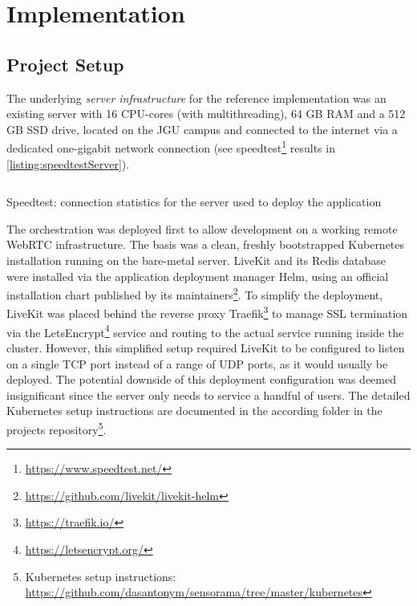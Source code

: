 \chapter{Implementation}
\label{ch:implementation}

\section{Project Setup}
\label{sec:project-setup}

The underlying \emph{server infrastructure} for the reference implementation was an existing server with 16 \ac{CPU}-cores (with multithreading), 64 \ac{GB} \ac{RAM} and a 512 \ac{GB} \ac{SSD} drive, located on the \ac{JGU} campus and connected to the internet via a dedicated one-gigabit network connection (see speedtest\footnote{\url{https://www.speedtest.net/}} results in \autoref{listing:speedtestServer}).

\begin{listing}[!ht]
\inputminted{text}{04_Artefakte/03_Listings/speedtest-server.txt}
\caption{Speedtest: connection statistics for the server used to deploy the application\protect}
\label{listing:speedtestServer}
\end{listing}

The orchestration was deployed first to allow development on a working remote WebRTC infrastructure.
The basis was a clean, freshly bootstrapped Kubernetes installation running on the bare-metal server.
LiveKit and its Redis database were installed via the application deployment manager Helm, using an official installation chart published by its maintainers\footnote{\url{https://github.com/livekit/livekit-helm}}.
To simplify the deployment, LiveKit was placed behind the reverse proxy Traefik\footnote{\url{https://traefik.io/}} to manage \ac{SSL} termination via the LetsEncrypt\footnote{\url{https://letsencrypt.org/}} service and routing to the actual service running inside the cluster.
However, this simplified setup required LiveKit to be configured to listen on a single \ac{TCP} port instead of a range of UDP ports, as it would usually be deployed.
The potential downside of this deployment configuration was deemed insignificant since the server only needs to service a handful of users.
The detailed Kubernetes setup instructions are documented in the according folder in the project\textquotesingle s repository\footnote{Kubernetes setup instructions: \href{https://github.com/dasantonym/sensorama/tree/master/kubernetes}{https://github.com/dasantonym/sensorama/tree/master/kubernetes}}.

